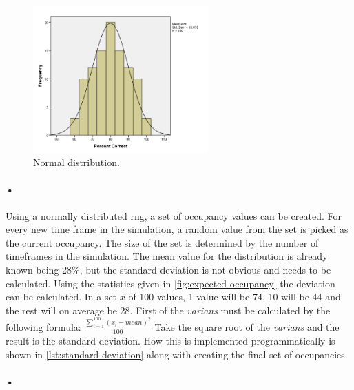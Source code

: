 \documentclass[a4paper, 12pt]{report}
\begin{document}
\begin{figure}[h!]
	\centering
		\includegraphics[width=0.6\textwidth]{images/normal-dist.png}
		\caption[Normal distribution.]{Normal distribution. \cite{normal-dist-image}}
		\label{fig:normal-dist}
\end{figure}

\paragraph{•}
Using a normally distributed \gls{rng}, a set of occupancy values can be created.
For every new time frame in the simulation, a random value from the set is picked as the current occupancy.
The size of the set is determined by the number of timeframes in the simulation.
The mean value for the distribution is already known being 28\%, but the standard deviation is not obvious and needs to be calculated.
Using the statistics given in \ref{fig:expected-occupancy} the deviation can be calculated.
In a set $x$ of 100 values, 1 value will be 74, 10 will be 44 and the rest will on average be 28.
First of the \textit{varians} must be calculated by the following formula:
$ \frac{\sum_{i=1}^{100} (x_i - mean)^2}{100}$
Take the square root of the \textit{varians} and the result is the standard deviation.
How this is implemented programmatically is shown in \ref{lst:standard-deviation} along with creating the final set of occupancies.

\paragraph{•}
\begin{minipage}{\linewidth}

\end{minipage}
\end{document}
